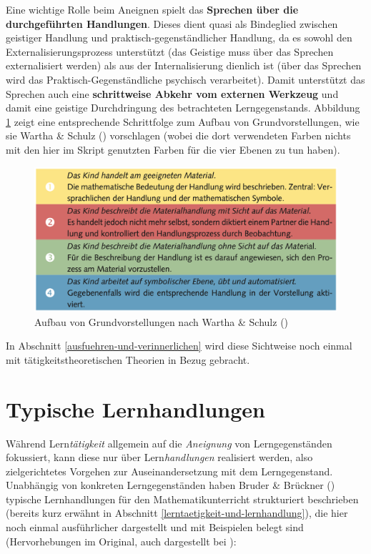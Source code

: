 \documentclass[
]{scrbook}
\theoremstyle{definition}
\theoremstyle{definition}
\theoremstyle{definition}
\theoremstyle{definition}
\theoremstyle{remark}
\begin{document}
Eine wichtige Rolle beim Aneignen spielt das \textbf{Sprechen über die durchgeführten Handlungen}. Dieses dient quasi als Bindeglied zwischen geistiger Handlung und praktisch-gegenständlicher Handlung, da es sowohl den Externalisierungsprozess unterstützt (das Geistige muss über das Sprechen externalisiert werden) als aus der Internalisierung dienlich ist (über das Sprechen wird das Praktisch-Gegenständliche psychisch verarbeitet). Damit unterstützt das Sprechen auch eine \textbf{schrittweise Abkehr vom externen Werkzeug} und damit eine geistige Durchdringung des betrachteten Lerngegenstands. Abbildung \ref{fig:GVverinnerlichen} zeigt eine entsprechende Schrittfolge zum Aufbau von Grundvorstellungen, wie sie Wartha \& Schulz () vorschlagen (wobei die dort verwendeten Farben nichts mit den hier im Skript genutzten Farben für die vier Ebenen zu tun haben).



\begin{figure}

{\centering \includegraphics[width=0.75\linewidth]{pictures/6-GVverinnerlichen} 

}

\caption{Aufbau von Grundvorstellungen nach Wartha \& Schulz ()}\label{fig:GVverinnerlichen}
\end{figure}

In Abschnitt \ref{ausfuehren-und-verinnerlichen} wird diese Sichtweise noch einmal mit tätigkeitstheoretischen Theorien in Bezug gebracht.

\section{Typische Lernhandlungen}\label{typische-lernhandlungen}

Während Lern\emph{tätigkeit} allgemein auf die \emph{Aneignung} von Lerngegenständen fokussiert, kann diese nur über Lern\emph{handlungen} realisiert werden, also zielgerichtetes Vorgehen zur Auseinandersetzung mit dem Lerngegenstand.
Unabhängig von konkreten Lerngegenständen haben Bruder \& Brückner () typische Lernhandlungen für den Mathematikunterricht strukturiert beschrieben (bereits kurz erwähnt in Abschnitt \ref{lerntaetigkeit-und-lernhandlung}), die hier noch einmal ausführlicher dargestellt und mit Beispielen belegt sind (Hervorhebungen im Original, auch dargestellt bei ):
\end{document}
